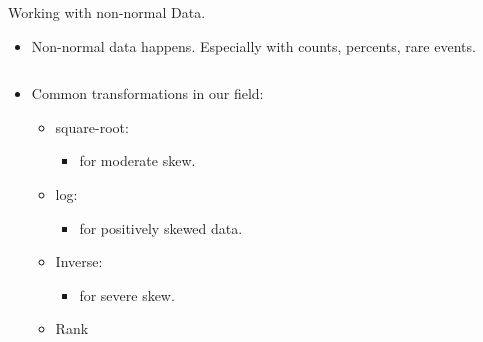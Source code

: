 \documentclass[
  ignorenonframetext,
]{beamer}
\providecommand{\tightlist}{%
  \setlength{\itemsep}{0pt}\setlength{\parskip}{0pt}}
\begin{document}
\begin{frame}{Working with non-normal Data.}
\label{working-with-non-normal-data.-1}
\begin{itemize}
\tightlist
\item
  Non-normal data happens. Especially with counts, percents, rare
  events.
\end{itemize}

\begin{columns}[T]
\begin{column}{0.48\textwidth}
\begin{itemize}
\tightlist
\item
  Common transformations in our field:

  \begin{itemize}
  \tightlist
  \item
    square-root:

    \begin{itemize}
    \tightlist
    \item
      for moderate skew.\\
    \end{itemize}
  \item
    log:

    \begin{itemize}
    \tightlist
    \item
      for positively skewed data.\\
    \end{itemize}
  \item
    Inverse:

    \begin{itemize}
    \tightlist
    \item
      for severe skew.\\
    \end{itemize}
  \item
    Rank\\
  \end{itemize}
\end{itemize}
\end{column}

\begin{column}{0.48\textwidth}
\begin{figure}


\end{figure}
\end{column}
\end{columns}
\end{frame}
\end{document}
